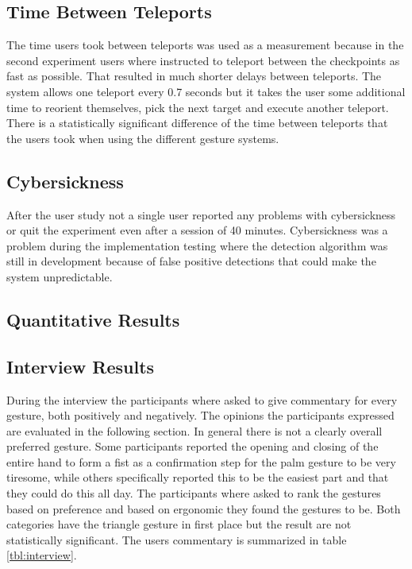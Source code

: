 \subsection{Time Between Teleports}
The time users took between teleports was used as a measurement because in the second experiment users where instructed to teleport between the checkpoints as fast as possible. That resulted in much shorter delays between teleports. The system allows one teleport every 0.7 seconds but it takes the user some additional time to reorient themselves, pick the next target and execute another teleport. There is a statistically significant difference of the time between teleports that the users took when using the different gesture systems. 





\subsection{Cybersickness}
After the user study not a single user reported any problems with cybersickness or quit the experiment even after a session of 40 minutes. Cybersickness was a problem during the implementation testing where the detection algorithm was still in development because of false positive detections that could make the system unpredictable.

\subsection{Quantitative Results}

\subsection{Interview Results}
During the interview the participants where asked to give commentary for every gesture, both positively and negatively. The opinions the participants expressed are evaluated in the following section. In general there is not a clearly overall preferred gesture. Some participants reported the opening and closing of the entire hand to form a fist as a confirmation step for the palm gesture to be very tiresome, while others specifically reported this to be the easiest part and that they could do this all day. The participants where asked to rank the gestures based on preference and based on ergonomic they found the gestures to be. Both categories have the triangle gesture in first place but the result are not statistically significant. The users commentary is summarized in table \ref{tbl:interview}. 

